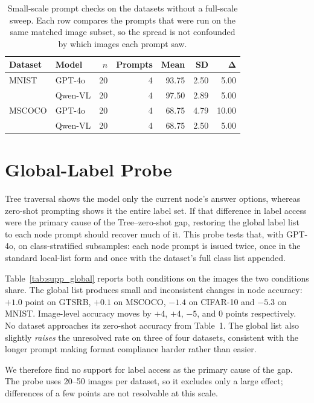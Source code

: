 \documentclass[10pt,twocolumn,letterpaper]{article}
\begin{document}
\begin{table}[t]
\centering
\caption{Small-scale prompt checks on the datasets without a full-scale sweep. Each row compares the prompts that were run on the same matched image subset, so the spread is not confounded by which images each prompt saw.}
\label{tab:supp_matched_prompts}
\footnotesize
\begin{tabular}{@{}llrrrrr@{}}
\toprule
\textbf{Dataset} & \textbf{Model} & $n$ & \textbf{Prompts} & \textbf{Mean} & \textbf{SD} & $\boldsymbol{\Delta}$ \\
\midrule
MNIST     & GPT-4o   & 20 & 4 & 93.75 & 2.50 & 5.00 \\
          & Qwen-VL  & 20 & 4 & 97.50 & 2.89 & 5.00 \\
MSCOCO    & GPT-4o   & 20 & 4 & 68.75 & 4.79 & 10.00 \\
          & Qwen-VL  & 20 & 4 & 68.75 & 2.50 & 5.00 \\
\bottomrule
\end{tabular}
\end{table}


\section{Global-Label Probe}
\label{sec:supp_global}

Tree traversal shows the model only the current node's answer options, whereas
zero-shot prompting shows it the entire label set. If that difference in label
access were the primary cause of the Tree--zero-shot gap, restoring the global
label list to each node prompt should recover much of it. This probe tests
that, with GPT-4o, on class-stratified subsamples: each node prompt is issued
twice, once in the standard local-list form and once with the dataset's full
class list appended.

Table~\ref{tab:supp_global} reports both conditions on the images the two
conditions share. The global list produces small and inconsistent changes in
node accuracy: $+1.0$ point on GTSRB, $+0.1$ on MSCOCO, $-1.4$ on CIFAR-10 and
$-5.3$ on MNIST. Image-level accuracy moves by $+4$, $+4$, $-5$, and $0$ points
respectively. No dataset approaches its zero-shot accuracy from Table~1. The
global list also slightly \emph{raises} the unresolved rate on three of four
datasets, consistent with the longer prompt making format compliance harder
rather than easier.

We therefore find no support for label access as the primary cause of the gap.
The probe uses 20--50 images per dataset, so it excludes only a large effect;
differences of a few points are not resolvable at this scale.
\end{document}
